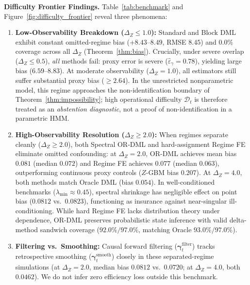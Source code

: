 \documentclass[twoside]{article}
\theoremstyle{definition}
\begin{document}
\textbf{Difficulty Frontier Findings.} Table~\ref{tab:benchmark} and Figure~\ref{fig:difficulty_frontier} reveal three phenomena:
\begin{enumerate}\setlength{\itemsep}{-3pt}\setlength{\parskip}{0pt}
    \item \textbf{Low-Observability Breakdown ($\Delta_Z \le 1.0$):} Standard and Block DML exhibit constant omitted-regime bias ($+8.43\text{--}8.49$, RMSE $8.45$) and $0.0\%$ coverage across all $\Delta_Z$ (Theorem~\ref{thm:bias}). Crucially, under severe overlap ($\Delta_Z \le 0.5$), \emph{all} methods fail: proxy error is severe ($\hat{\varepsilon}_\gamma = 0.78$), yielding large bias ($6.59\text{--}8.83$). At moderate observability ($\Delta_Z = 1.0$), all estimators still suffer substantial proxy bias ($\ge 2.64$). In the unrestricted nonparametric model, this regime approaches the non-identification boundary of Theorem~\ref{thm:impossibility}; high operational difficulty $\mathcal{D}_t$ is therefore treated as an \emph{abstention diagnostic}, not a proof of non-identification in a parametric HMM.
    \item \textbf{High-Observability Resolution ($\Delta_Z \ge 2.0$):} When regimes separate cleanly ($\Delta_Z \ge 2.0$), both Spectral OR-DML and hard-assignment Regime FE eliminate omitted confounding: at $\Delta_Z=2.0$, OR-DML achieves mean bias $0.081$ (median $0.072$) and Regime FE achieves $0.077$ (median $0.063$), outperforming continuous proxy controls ($Z$-GBM bias $0.207$). At $\Delta_Z=4.0$, both methods match Oracle DML (bias $0.054$). In well-conditioned benchmarks ($\lambda_{\min} \approx 0.45$), spectral shrinkage has negligible effect on point bias ($0.0812$ vs.\ $0.0823$), functioning as insurance against near-singular ill-conditioning. While hard Regime FE lacks distribution theory under dependence, OR-DML preserves probabilistic state inference with valid delta-method sandwich coverage ($92.0\% / 97.0\%$, matching Oracle $93.0\% / 97.0\%$).
    \item \textbf{Filtering vs.\ Smoothing:} Causal forward filtering ($\boldsymbol{\gamma}_t^{\mathrm{filter}}$) tracks retrospective smoothing ($\boldsymbol{\gamma}_t^{\mathrm{smooth}}$) closely in these separated-regime simulations (at $\Delta_Z = 2.0$, median bias $0.0812$ vs.\ $0.0720$; at $\Delta_Z = 4.0$, both $0.0462$). We do not infer zero efficiency loss outside this benchmark.
\end{enumerate}
\end{document}
